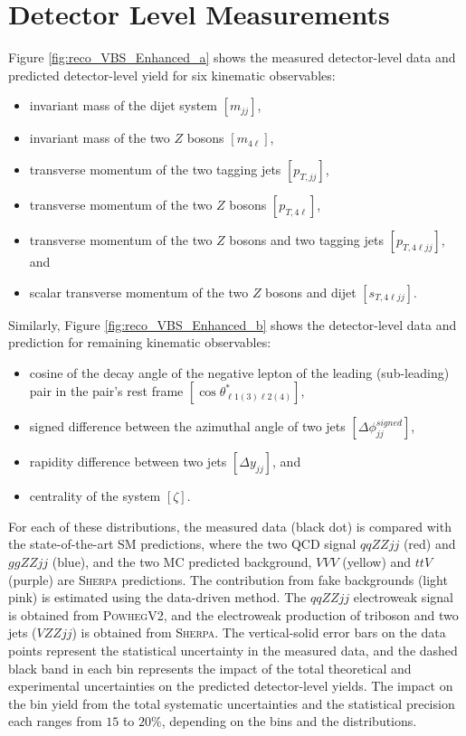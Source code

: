 \section{ Detector Level Measurements }
\label{sec:DetectorLevel_Measurement}

Figure \ref{fig:reco_VBS_Enhanced_a} shows the measured detector-level data and predicted detector-level yield for six kinematic observables:
\begin{itemize}
    \item{ invariant mass of the dijet system $[m_{jj}]$},
    \item{ invariant mass of the two $Z$ bosons $[m_{4\ell}]$},
    \item{ transverse momentum of the two tagging jets $[p_{T,jj}]$},
    \item{ transverse momentum of the two $Z$ bosons $[p_{T,4\ell}]$},
    \item{ transverse momentum of the two $Z$ bosons and two tagging jets $[p_{T,4\ell jj}]$}, and 
    \item{ scalar transverse momentum of the two $Z$ bosons and dijet $[s_{T,4\ell jj}]$}.
\end{itemize}
Similarly, Figure \ref{fig:reco_VBS_Enhanced_b} shows the detector-level data and prediction for remaining kinematic observables:
\begin{itemize}
\item{ cosine of the decay angle of the negative lepton of the leading (sub-leading) pair in the pair's rest frame $[\cos \theta^{*}_{\ell 1 (3) \ell 2 (4)}]$},
\item{ signed difference between the azimuthal angle of two jets $[\Delta \phi _{jj}^{signed}]$},
\item{ rapidity difference between two jets $[\Delta y_{jj}]$}, and 
\item{ centrality of the system $[\zeta]$}.
\end{itemize}
For each of these distributions, the measured data (black dot) is compared with the state-of-the-art SM predictions, where the two QCD signal $qqZZjj$ (red) and $ggZZjj$ (blue), and the two MC predicted background, $VVV$ (yellow) and $ttV$ (purple) are \textsc{Sherpa} predictions. The contribution from fake backgrounds (light pink) is estimated using the data-driven method. The $qqZZjj$ electroweak signal is obtained from \textsc{PowhegV2}, and the electroweak production of triboson and two jets ($VZZjj$) is obtained from \textsc{Sherpa}. The vertical-solid error bars on the data points represent the statistical uncertainty in the measured data, and the dashed black band in each bin represents the impact of the total theoretical and experimental uncertainties on the predicted detector-level yields. The impact on the bin yield from the total systematic uncertainties and the statistical precision each ranges from $15$ to $20\%$, depending on the bins and the distributions. 

